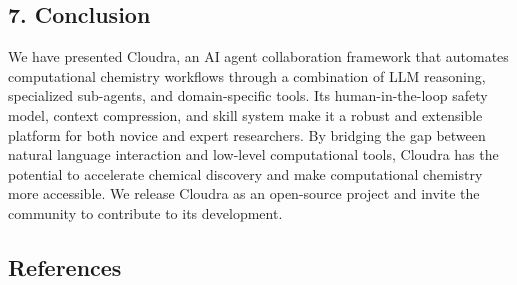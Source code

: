 \hypertarget{conclusion}{%
\subsection{7. Conclusion}\label{conclusion}}

We have presented Cloudra, an AI agent collaboration framework that
automates computational chemistry workflows through a combination of LLM
reasoning, specialized sub-agents, and domain-specific tools. Its
human-in-the-loop safety model, context compression, and skill system
make it a robust and extensible platform for both novice and expert
researchers. By bridging the gap between natural language interaction
and low-level computational tools, Cloudra has the potential to
accelerate chemical discovery and make computational chemistry more
accessible. We release Cloudra as an open-source project and invite the
community to contribute to its development.

\hypertarget{references}{%
\subsection{References}\label{references}}

